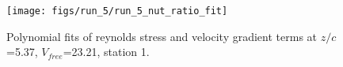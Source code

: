 \begin{figure}[H]
\centering
\texttt{[image: figs/run\_5/run\_5\_nut\_ratio\_fit]}
\caption{Polynomial fits of reynolds stress and velocity gradient terms at $z/c$=5.37, $V_{free}$=23.21, station 1.}
\label{fig:run_5_nut_ratio_fit}
\end{figure}


